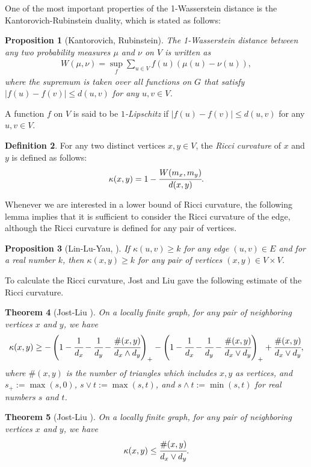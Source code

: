 \documentclass[leqno,12pt]{amsart} %
\theoremstyle{plain} %
\newtheorem{theorem}{\indent\sc Theorem}[section] %
\newtheorem{proposition}[theorem]{\indent\sc Proposition}
\theoremstyle{definition} %
\newtheorem{definition}[theorem]{\indent\sc Definition}
\begin{document}
   One of the most important properties of the 1-Wasserstein distance is the Kantorovich-Rubinstein duality, which is stated as follows:
	\begin{proposition}[Kantorovich, Rubinstein]
	\label{kantoro}
	The 1-Wasserstein distance between any two probability measures $\mu$ and $\nu$ on $V$ is written as
		\begin{eqnarray*}
		W(\mu, \nu) = \sup_{f} \sum_{u \in V} f(u)(\mu(u) - \nu(u)),
		\end{eqnarray*}
	where the supremum is taken over all functions on $G$ that satisfy $|f(u)-f(v)| \leq d(u,v)$ for any $u, v \in V$. 
	\end{proposition}
A function $f$ on $V$ is said to be {\em $1$-Lipschitz} if $|f(u)-f(v)| \leq d(u,v)$ for any $u, v \in V$.
\begin{definition}
	\label{Ricci}
For any two distinct vertices $x, y \in V$, the {\em Ricci curvature} of $x$ and $y$ is defined as follows:
   	\begin{eqnarray*}
    	\kappa(x, y) =  1 - \cfrac{W(m_{x}, m_{y})}{d(x, y)}.
   	\end{eqnarray*}
\end{definition}

Whenever we are interested in a lower bound of Ricci curvature, the following lemma implies that it is sufficient to consider the Ricci curvature of the edge, although the Ricci curvature is defined for any pair of vertices.
\begin{proposition}[Lin-Lu-Yau, \cite{Yau1}]
If $\kappa(u, v) \geq k$ for any edge $(u, v) \in E$ and for a real number $k$, then $\kappa(x, y) \geq k$ for any pair of vertices $(x, y) \in V \times V$.
\end{proposition}

To calculate the Ricci curvature, Jost and Liu gave the following estimate of the Ricci curvature.
\begin{theorem}[Jost-Liu \cite{Jo2}]
\label{Jost-Liuの評価}
On a locally finite graph, for any pair of neighboring vertices $x$ and $y$, we have
\begin{eqnarray*}
\kappa(x, y) \geq - \left( 1- \cfrac{1}{d_x} - \cfrac{1}{d_y} - \cfrac{\# (x, y)}{d_x \wedge d_y} \right)_+ - \left( 1- \cfrac{1}{d_x} - \cfrac{1}{d_y} - \cfrac{\# (x, y)}{d_x \vee d_y} \right)_+ + \cfrac{\# (x, y)}{d_x \vee d_y},
\end{eqnarray*}
where $\# (x, y)$ is the number of triangles which includes $x, y$ as vertices, and $s_+ := \max (s, 0)$, $s \vee t := \max (s, t)$, and $s \wedge t := \min (s, t)$ for real numbers $s$ and $t$.
\end{theorem}
\begin{theorem}[Jost-Liu \cite{Jo2}]
\label{Jost-Liuの評価２}
On a locally finite graph, for any pair of neighboring vertices $x$ and $y$, we have
\begin{eqnarray*}
\kappa(x, y) \leq \cfrac{\#(x,y)}{d_x \vee d_y}.
\end{eqnarray*}
\end{theorem}
 
\end{document}
